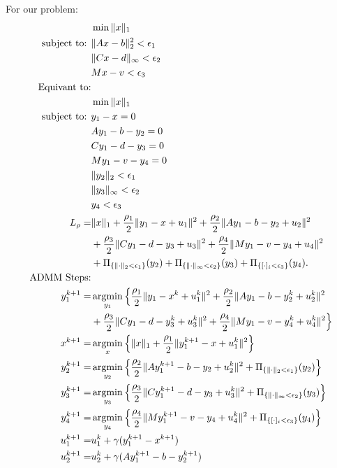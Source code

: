 \documentclass[annual]{acmsiggraph}
\begin{document}
For our problem:
\begin{align}
&\min\|x\|_1\\
\mbox{subject to: }&\|Ax-b\|_2^2<\epsilon_1\\
&\|Cx-d\|_{\infty}<\epsilon_2\\
&Mx-v<\epsilon_3\\
\mbox{Equivant to:}&\notag\\
&\min\|x\|_1\\
\mbox{subject to: }&y_1-x=0\\
&Ay_1-b-y_2=0\\
&Cy_1-d-y_3=0\\
&My_1-v-y_4=0\\
&\|y_2\|_2<\epsilon_1\\
&\|y_3\|_{\infty}<\epsilon_2\\
&y_4<\epsilon_3\\
L_\rho=&\|x\|_1+\frac{\rho_1}{2}\|y_1-x+u_1\|^2+\frac{\rho_2}{2}\|Ay_1-b-y_2+u_2\|^2\notag\\
&+\frac{\rho_3}{2}\|Cy_1-d-y_3+u_3\|^2+\frac{\rho_4}{2}\|My_1-v-y_4+u_4\|^2\notag\\
&+\Pi_{\{\|\cdot\|_2<\epsilon_1\}}(y_2)+\Pi_{\{\|\cdot\|_{\infty}<\epsilon_2\}}(y_3)+\Pi_{\{[\cdot]_i<\epsilon_3\}}(y_4).\\
\mbox{ADMM Steps:}&\notag\\
y_1^{k+1}=&\operatornamewithlimits{argmin}\limits_{y_1} \Big\{\frac{\rho_1}{2}\|y_1-x^k+u_1^k\|^2+\frac{\rho_2}{2}\|Ay_1-b-y_2^k+u_2^k\|^2\notag\\
&+\frac{\rho_3}{2}\|Cy_1-d-y_3^k+u_3^k\|^2+\frac{\rho_4}{2}\|My_1-v-y_4^k+u_4^k\|^2 \Big\} \\
x^{k+1}=&\operatornamewithlimits{argmin}\limits_{x} \Big\{\|x\|_1+\frac{\rho_1}{2}\|y_1^{k+1}-x+u_1^k\|^2\Big\}\\
y_2^{k+1}=&\operatornamewithlimits{argmin}\limits_{y_2} \Big\{\frac{\rho_2}{2}\|Ay_1^{k+1}-b-y_2+u_2^k\|^2+\Pi_{\{\|\cdot\|_2<\epsilon_1\}}(y_2)\Big\}\\
y_3^{k+1}=&\operatornamewithlimits{argmin}\limits_{y_3} \Big\{\frac{\rho_3}{2}\|Cy_1^{k+1}-d-y_3+u_3^k\|^2+\Pi_{\{\|\cdot\|_{\infty}<\epsilon_2\}}(y_3)\Big\}\\
y_4^{k+1}=&\operatornamewithlimits{argmin}\limits_{y_4} \Big\{\frac{\rho_4}{2}\|My_1^{k+1}-v-y_4+u_4^k\|^2+\Pi_{\{[\cdot]_i<\epsilon_3\}}(y_4)\Big\}\\
u_1^{k+1}=&u_1^k+\gamma(y_1^{k+1}-x^{k+1})\\
u_2^{k+1}=&u_2^k+\gamma(Ay_1^{k+1}-b-y_2^{k+1})\\

\end{align}
\end{document}

